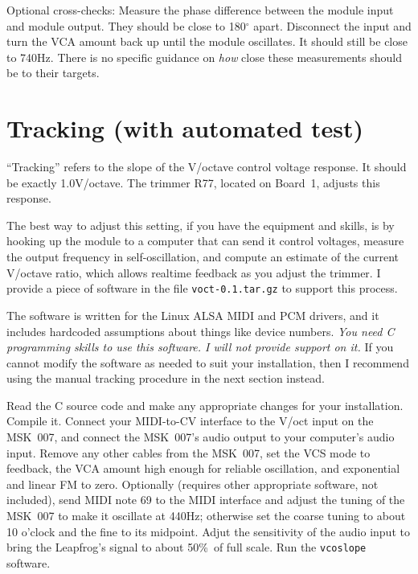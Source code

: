 Optional cross-checks:  Measure the phase difference between the module
input and module output.  They should be close to 180$^\circ$ apart. 
Disconnect the input and turn the VCA amount back up until the module
oscillates.  It should still be close to 740Hz.  There is no specific
guidance on \emph{how} close these measurements should be to their targets.

\section{Tracking (with automated test)}

``Tracking'' refers to the slope of the V/octave control voltage response. 
It should be exactly 1.0V/octave.  The trimmer R77, located on Board~1,
adjusts this response.

The best way to adjust this setting, if you have the equipment and
skills, is by hooking up the module to a computer that can send it control
voltages, measure the output frequency in self-oscillation, and compute an
estimate of the current V/octave ratio, which allows realtime feedback as
you adjust the trimmer.  I provide a piece of software in the file
\texttt{voct-0.1.tar.gz} to support this process.

The software is written for the Linux ALSA MIDI and PCM drivers, and it
includes hardcoded assumptions about things like device numbers.  \emph{You
need C programming skills to use this software.  I will not provide
support on it.}  If you cannot modify the software as needed to suit your
installation, then I recommend using the manual tracking procedure in the
next section instead.

Read the C source code and make any appropriate changes for your
installation.  Compile it.  Connect your MIDI-to-CV interface to the V/oct
input on the MSK~007, and connect the MSK~007's audio output to your
computer's audio input.  Remove any other cables from the MSK~007, set the
VCS mode to feedback, the VCA amount high enough for reliable oscillation,
and exponential and linear FM to zero.  Optionally (requires other
appropriate software, not included), send MIDI note 69 to the MIDI interface
and adjust the tuning of the MSK~007 to make it oscillate at 440Hz;
otherwise set the coarse tuning to about 10 o'clock and the fine to its
midpoint. 
Adjut the sensitivity of the audio input to bring the Leapfrog's signal to
about 50\%\ of full scale.  Run the \texttt{vcoslope} software.

